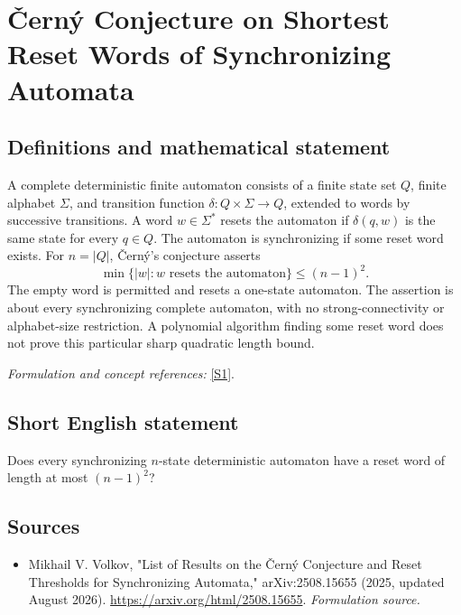 \documentclass[11pt]{article}
\begin{document}
\section*{\texorpdfstring{Černý Conjecture on Shortest Reset Words of Synchronizing Automata}{Černý Conjecture on Shortest Reset Words of Synchronizing Automata}}\label{30006893}
\subsection{Definitions and mathematical statement}
A complete deterministic finite automaton consists of a finite state set $Q$, finite alphabet $\Sigma$, and transition function $\delta:Q\times\Sigma\to Q$, extended to words by successive transitions. A word $w\in\Sigma^*$ resets the automaton if $\delta(q,w)$ is the same state for every $q\in Q$. The automaton is synchronizing if some reset word exists. For $n=|Q|$, \v{C}ern\'y's conjecture asserts
\[
 \min\{|w|:w\text{ resets the automaton}\}\le(n-1)^2.
\]
The empty word is permitted and resets a one-state automaton. The assertion is about every synchronizing complete automaton, with no strong-connectivity or alphabet-size restriction. A polynomial algorithm finding some reset word does not prove this particular sharp quadratic length bound.
\par\smallskip\textit{Formulation and concept references:} \href{https://arxiv.org/html/2508.15655}{[S1]}.

\subsection{Short English statement}
Does every synchronizing $n$-state deterministic automaton have a reset word of length at most $(n-1)^2$?
\subsection{Sources}
\begin{itemize}
\item[S1]Mikhail V. Volkov, "List of Results on the Černý Conjecture and Reset Thresholds for Synchronizing Automata," arXiv:2508.15655 (2025, updated August 2026).
\url{https://arxiv.org/html/2508.15655}.
\textit{Formulation source.}
\end{itemize}
\end{document}
